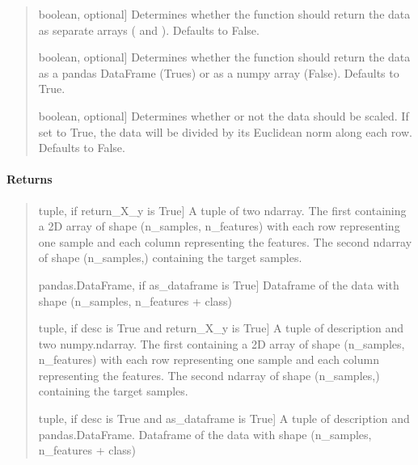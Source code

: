 \documentclass[letterpaper,10pt,english,openany,oneside]{sphinxmanual}
\begin{document}
\begin{fulllineitems}
\begin{quote}
\begin{description}
\sphinxlineitem{return\_X\_y}{[}boolean, optional{]}
\sphinxAtStartPar
Determines whether the function should return the data as separate arrays ( and ). 
Defaults to False.

\sphinxlineitem{as\_dataframe}{[}boolean, optional{]}
\sphinxAtStartPar
Determines whether the function should return the data as a pandas DataFrame (Trues) 
or as a numpy array (False). Defaults to True.

\sphinxlineitem{scaled}{[}boolean, optional{]}
\sphinxAtStartPar
Determines whether or not the data should be scaled. If set to True, the data will be 
divided by its Euclidean norm along each row. Defaults to False.

\end{description}
\end{quote}


\paragraph{Returns}
\label{\detokenize{api_reference/generated/QuadratiK.datasets.load_wireless_data:returns}}\begin{quote}
\begin{description}
\sphinxlineitem{(data, target)}{[}tuple, if return\_X\_y is True{]}
\sphinxAtStartPar
A tuple of two ndarray. The first containing a 2D array of shape
(n\_samples, n\_features) with each row representing one sample and
each column representing the features. The second ndarray of shape
(n\_samples,) containing the target samples.

\sphinxlineitem{data}{[}pandas.DataFrame, if as\_dataframe is True{]}
\sphinxAtStartPar
Dataframe of the data with shape (n\_samples, n\_features + class)

\sphinxlineitem{(desc, data, target)}{[}tuple, if desc is True and return\_X\_y is True{]}
\sphinxAtStartPar
A tuple of description and two numpy.ndarray. The first containing a 2D 
array of shape (n\_samples, n\_features) with each row representing 
one sample and each column representing the features. The second 
ndarray of shape (n\_samples,) containing the target samples.

\sphinxlineitem{(desc, data)}{[}tuple, if desc is True and as\_dataframe is True{]}
\sphinxAtStartPar
A tuple of description and pandas.DataFrame.
Dataframe of the data with shape (n\_samples, n\_features + class)

\end{description}
\end{quote}



\end{fulllineitems}
\end{document}
